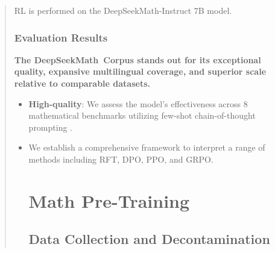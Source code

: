 \begin{abstract}
RL is performed on the DeepSeekMath-Instruct 7B model. \subsubsection{Evaluation Results}

\textbf{The DeepSeekMath~Corpus stands out for its exceptional quality, expansive multilingual coverage, and superior scale relative to comparable datasets.}

\begin{itemize}[topsep=0pt]
    \item \textbf{High-quality}:
    We assess the model’s effectiveness across 8 mathematical benchmarks utilizing few-shot chain-of-thought prompting \cite{cot}. \item We establish a comprehensive framework to interpret a range of methods including RFT, DPO, PPO, and GRPO. \section{Math Pre-Training}

\subsection{Data Collection and Decontamination}


\end{itemize}
\end{abstract}
